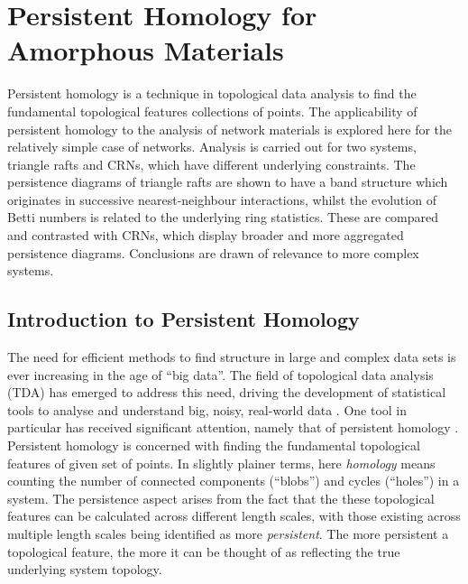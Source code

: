 \chapter[Persistent Homology for Amorphous Materials]{Persistent Homology for \\ Amorphous Materials}
\label{ch:ph}

\begin{chapterabstract}
Persistent homology is a technique in topological data analysis to find the fundamental topological features collections of points.
The applicability of persistent homology to the analysis of network materials is explored here for the relatively simple case of \td{} networks. 
Analysis is carried out for two systems, triangle rafts and CRNs, which have different underlying constraints.
The persistence diagrams of triangle rafts are shown to have a band structure which originates in successive nearest\--neighbour interactions, whilst the evolution of Betti numbers is related to the underlying ring statistics.
These are compared and contrasted with CRNs, which display broader and more aggregated persistence diagrams.
Conclusions are drawn of relevance to more complex systems.
\end{chapterabstract}

\section{Introduction to Persistent Homology}

The need for efficient methods to find structure in large and complex data sets is ever increasing in the age of ``big data''.
The field of topological data analysis (TDA) has emerged to address this need, driving the development of statistical tools to analyse and understand big, noisy, real\--world data \cite{Wasserman2018}.
One tool in particular has received significant attention, namely that of persistent homology \cite{Edelsbrunner2008}.
Persistent homology is concerned with finding the fundamental topological features of given set of points. 
In slightly plainer terms, here \textit{homology} means counting the number of connected components (``blobs'') and cycles (``holes'') in a system.
The persistence aspect arises from the fact that the these topological features can be calculated across different length scales, with those existing across multiple length scales being identified as more \textit{persistent}.
The more persistent a topological feature, the more it can be thought of as reflecting the true underlying system topology.

